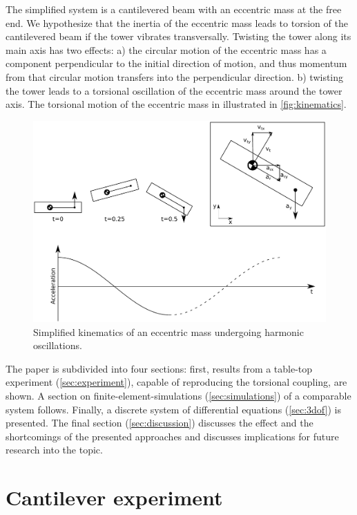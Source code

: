 \documentclass{article}
\begin{document}
The simplified system is a cantilevered beam with an eccentric mass at the free end. We hypothesize that the inertia of the eccentric mass leads to torsion of the cantilevered beam if the tower vibrates transversally. Twisting the tower along its main axis has two effects: a) the circular motion of the eccentric mass has a component perpendicular to the initial direction of motion, and thus momentum from that circular motion transfers into the perpendicular direction. b) twisting the tower leads to a torsional oscillation of the eccentric mass around the tower axis. The torsional motion of the eccentric mass in illustrated in \autoref{fig:kinematics}.

\clearpage

\begin{figure}[ht!]
    \centering
    \includegraphics[width=0.7\linewidth]{figures/kinematics.pdf}
    \caption{Simplified kinematics of an eccentric mass undergoing harmonic oscillations.}
    \label{fig:kinematics}
\end{figure}

The paper is subdivided into four sections: first, results from a table-top experiment (\autoref{sec:experiment}), capable of reproducing the torsional coupling, are shown. A section on finite-element-simulations (\autoref{sec:simulations}) of a comparable system follows. Finally, a discrete system of differential equations (\autoref{sec:3dof}) is presented. The final section (\autoref{sec:discussion}) discusses the effect and the shortcomings of the presented approaches and discusses implications for future research into the topic. 

\clearpage

\section{Cantilever experiment}
\label{sec:experiment}
\end{document}
